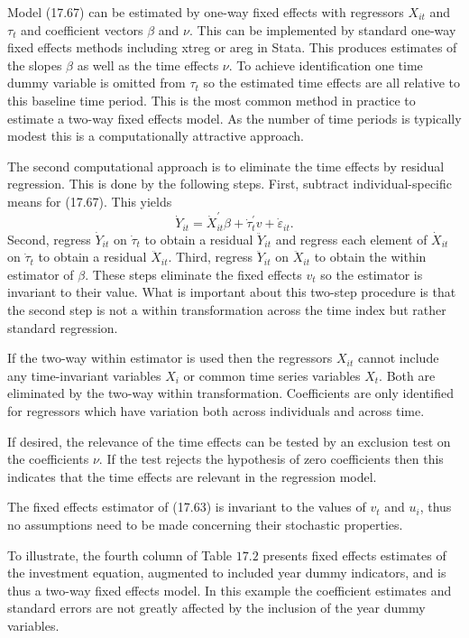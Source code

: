 \documentclass[10pt]{article}
\begin{document}
Model (17.67) can be estimated by one-way fixed effects with regressors $X_{i t}$ and $\tau_{t}$ and coefficient vectors $\beta$ and $\nu$. This can be implemented by standard one-way fixed effects methods including xtreg or areg in Stata. This produces estimates of the slopes $\beta$ as well as the time effects $\nu$. To achieve identification one time dummy variable is omitted from $\tau_{t}$ so the estimated time effects are all relative to this baseline time period. This is the most common method in practice to estimate a two-way fixed effects model. As the number of time periods is typically modest this is a computationally attractive approach.

The second computational approach is to eliminate the time effects by residual regression. This is done by the following steps. First, subtract individual-specific means for (17.67). This yields
$$
\dot{Y}_{i t}=\dot{X}_{i t}^{\prime} \beta+\dot{\tau}_{t}^{\prime} v+\dot{\varepsilon}_{i t} .
$$
Second, regress $\dot{Y}_{i t}$ on $\dot{\tau}_{t}$ to obtain a residual $\ddot{Y}_{i t}$ and regress each element of $\dot{X}_{i t}$ on $\dot{\tau}_{t}$ to obtain a residual $\ddot{X}_{i t}$. Third, regress $\ddot{Y}_{i t}$ on $\ddot{X}_{i t}$ to obtain the within estimator of $\beta$. These steps eliminate the fixed effects $v_{t}$ so the estimator is invariant to their value. What is important about this two-step procedure is that the second step is not a within transformation across the time index but rather standard regression.

If the two-way within estimator is used then the regressors $X_{i t}$ cannot include any time-invariant variables $X_{i}$ or common time series variables $X_{t}$. Both are eliminated by the two-way within transformation. Coefficients are only identified for regressors which have variation both across individuals and across time.

If desired, the relevance of the time effects can be tested by an exclusion test on the coefficients $\nu$. If the test rejects the hypothesis of zero coefficients then this indicates that the time effects are relevant in the regression model.

The fixed effects estimator of (17.63) is invariant to the values of $v_{t}$ and $u_{i}$, thus no assumptions need to be made concerning their stochastic properties.

To illustrate, the fourth column of Table $17.2$ presents fixed effects estimates of the investment equation, augmented to included year dummy indicators, and is thus a two-way fixed effects model. In this example the coefficient estimates and standard errors are not greatly affected by the inclusion of the year dummy variables.
\end{document}
